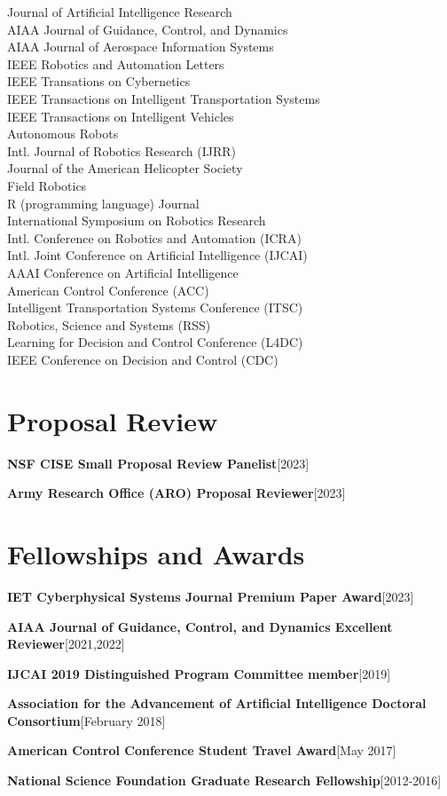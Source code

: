 \documentclass[10pt,roman]{moderncv}
\newcommand{\mycvitem}[2]{
    \textbf{#2}\hfill [#1]\break
}
\begin{document}
\vspace{-2ex}
\begin{multicols}{2}
\small
Journal of Artificial Intelligence Research\\
AIAA Journal of Guidance, Control, and Dynamics\\
AIAA Journal of Aerospace Information Systems\\
IEEE Robotics and Automation Letters\\
IEEE Transations on Cybernetics\\
IEEE Transactions on Intelligent Transportation Systems\\
IEEE Transactions on Intelligent Vehicles\\
Autonomous Robots\\
Intl. Journal of Robotics Research (IJRR)\\
Journal of the American Helicopter Society\\
Field Robotics\\
R (programming language) Journal\\
International Symposium on Robotics Research\\
Intl. Conference on Robotics and Automation (ICRA)\\
Intl. Joint Conference on Artificial Intelligence (IJCAI)\\
AAAI Conference on Artificial Intelligence\\
American Control Conference (ACC)\\
Intelligent Transportation Systems Conference (ITSC)\\
Robotics, Science and Systems (RSS)\\
Learning for Decision and Control Conference (L4DC)\\
IEEE Conference on Decision and Control (CDC)\\
\end{multicols}

\section{Proposal Review}
\mycvitem{2023}{NSF CISE Small Proposal Review Panelist}
\mycvitem{2023}{Army Research Office (ARO) Proposal Reviewer}

\section{Fellowships and Awards}

\mycvitem{2023}{IET Cyberphysical Systems Journal Premium Paper Award}
\mycvitem{2021,2022}{AIAA Journal of Guidance, Control, and Dynamics Excellent Reviewer}
\mycvitem{2019}{IJCAI 2019 Distinguished Program Committee member}
\mycvitem{February 2018}{Association for the Advancement of Artificial Intelligence Doctoral Consortium}
\mycvitem{May 2017}{American Control Conference Student Travel Award}
\mycvitem{2012-2016}{National Science Foundation Graduate Research Fellowship}
\end{document}
